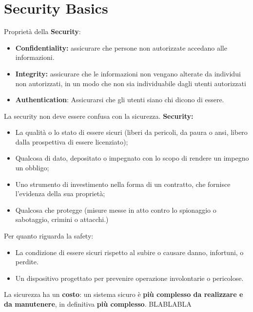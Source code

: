 \documentclass[12pt]{article}
\begin{document}
	
	\maketitle
	\tableofcontents
	\listoftables
	\listoffigures
	
	\section{Security Basics}
		Proprietà della \textbf{Security}:
		\begin{itemize}
			\item \textbf{Confidentiality:} assicurare che persone non autorizzate accedano alle informazioni.
			\item \textbf{Integrity:} assicurare che le informazioni non vengano alterate da individui non autorizzati, in un modo che non sia individuabile dagli utenti autorizzati
			\item \textbf{Authentication}: Assicurarsi che gli utenti siano chi  dicono di essere.
		\end{itemize}
		La security non deve essere confusa con la sicurezza. \textbf{Security:}
		\begin{itemize}
			\item La qualità o lo stato di essere sicuri (liberi da pericoli, da paura o ansi, libero dalla prospettiva di essere licenziato);
			\item Qualcosa di dato, depositato o impegnato con lo scopo di rendere un impegno un obbligo;
			\item Uno strumento di investimento nella forma di un contratto, che fornisce l'evidenza della sua proprietà;
			\item Qualcosa che protegge (misure messe in atto contro lo spionaggio o sabotaggio, crimini o attacchi.)
		\end{itemize}
		Per quanto riguarda la safety:
		\begin{itemize}
			\item La condizione di essere sicuri rispetto al subire o causare danno, infortuni, o perdite.
			\item Un dispositivo progettato per prevenire operazione involontarie o pericolose.	
		\end{itemize}
		La sicurezza ha un \textbf{costo}: un sistema sicuro è \textbf{più complesso da realizzare e da manutenere}, in definitiva \textbf{più complesso}. BLABLABLA
		
\end{document}
